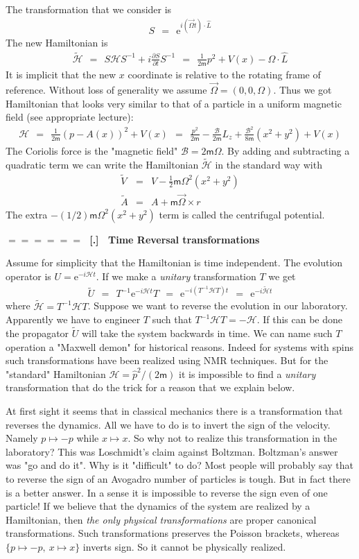 \documentclass[onecolumn,fleqn]{revtex4}
\newcommand{\eexp}{\mathrm{e}^}
\newcommand{\mass}{\mathsf{m}}
\newcommand{\beq}{\begin{eqnarray}}
\newcommand{\eeq}{\end{eqnarray}}
\renewcommand{\thesubsection}{\arabic{subsection}}
\renewcommand{\thesubsubsection}{\arabic{subsubsection}}
\newcommand{\sheadC}[1]
{
\addtocounter{subsubsection}{1}
\vspace{5mm}
{\Large\bf $=\!=\!=\!=\!=\!=\;$ [\thesubsection.\thesubsubsection] \ #1}  
\nopagebreak
\phantomsection
}
\begin{document}
The transformation that we consider is 
\beq 
S \ \ = \ \ \eexp{i(\vec{\Omega} t) \cdot \hat{L}}
\eeq
The new Hamiltonian is 
\beq 
\tilde{\mathcal{H}}
\ \ = \ \ S\mathcal{H}S^{-1}+i\frac{\partial S}{\partial t}S^{-1}
\ \ = \ \ \frac{1}{2\mass}p^2 + V(x) - \Omega \cdot \hat{L} 
\eeq
It is implicit that the new $x$ coordinate 
is relative to the rotating frame of reference. 
Without loss of generality we assume $\vec{\Omega}=(0,0,\Omega)$.
Thus we got Hamiltonian that looks very similar to that 
of a particle in a uniform magnetic field (see appropriate lecture): 
\beq
\mathcal{H} 
\ \ = \ \ 
\frac{1}{2\mass}(p-A(x))^{2} + V(x) 
\ \ = \ \ 
\frac{p^2}{2\mass} - \frac{\mathcal{B}}{2\mass} L_{z}
+\frac{\mathcal{B}^2}{8\mass}(x^2+y^2) + V(x)
\eeq
The Coriolis force is the 
"magnetic field" $\mathcal{B} = 2\mass\Omega$. 
By adding and subtracting a quadratic term we can 
write the Hamiltonian $\tilde{\mathcal{H}}$ 
in the standard way with 
\beq
\tilde{V} &=& V - \frac{1}{2}\mass \Omega^2 (x^2+y^2) 
\\ \nonumber
\tilde{A} &=& A + \mass \vec{\Omega} \times r  
\eeq
The extra $-(1/2)\mass\Omega^2(x^2+y^2)$ term 
is called the centrifugal potential.





\sheadC{Time Reversal transformations} 
 
 
Assume for simplicity that the Hamiltonian is time independent. 
The evolution operator is $U=\eexp{-i\mathcal{H}t}$. 
If we make a {\em unitary} transformation $T$ we get  
\beq
\tilde{U} 
\ \ = \ \ T^{-1} \eexp{-i\mathcal{H}t} T 
\ \  = \ \ \eexp{-i (T^{-1} \mathcal{H} T) t} 
\ \ = \ \ \eexp{-i\tilde{\mathcal{H}}t}
\eeq
where $\tilde{\mathcal{H}} = T^{-1} \mathcal{H} T$. 
Suppose we want to reverse the evolution in our laboratory. 
Apparently we have to engineer $T$ such that $T^{-1} \mathcal{H} T = -\mathcal{H}$.
If this can be done the propagator $\tilde{U}$ will take 
the system backwards in time. We can name such $T$ operation 
a "Maxwell demon" for historical reasons. Indeed for systems 
with spins such transformations have been realized using NMR techniques. 
But for the "standard" Hamiltonian $\mathcal{H}=\hat{p}^{2}/(2\mass)$ 
it is impossible to find a {\em unitary} transformation that do the trick 
for a reason that we explain below.


At first sight it seems that in classical mechanics there is a transformation 
that reverses the dynamics. All we have to do is to invert 
the sign of the velocity. Namely $p \mapsto -p$ while $x\mapsto x$. 
So why not to realize this transformation in the laboratory? 
This was Loschmidt's claim against Boltzman. 
Boltzman's answer was "go and do it". 
Why is it "difficult" to do? 
Most people will probably say that to reverse the sign 
of an Avogadro number of particles is tough. 
But in fact there is a better answer. 
In a sense it is impossible to reverse the sign 
even of one particle! If we believe that the dynamics 
of the system are realized by a Hamiltonian, 
then {\em the only physical transformations} 
are proper canonical transformations.
Such transformations preserves the Poisson brackets, 
whereas ${\{ p \mapsto -p, \ x\mapsto x\}}$ inverts sign.
So it cannot be physically realized.  
  
\end{document}
